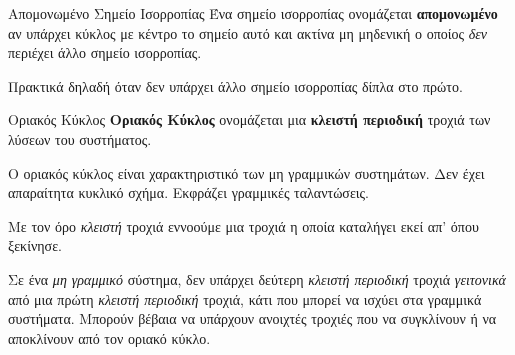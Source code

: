 \documentclass[11pt,a4paper,notitlepage,fleqn]{article}
\begin{document}
\begin{defn}{Απομονωμένο Σημείο Ισορροπίας}{}
	Ένα σημείο ισορροπίας ονομάζεται \textbf{απομονωμένο} αν υπάρχει κύκλος
	με κέντρο το σημείο αυτό και ακτίνα μη μηδενική ο οποίος \textit{δεν} περιέχει άλλο
	σημείο ισορροπίας.
	
	Πρακτικά δηλαδή όταν δεν υπάρχει άλλο σημείο ισορροπίας δίπλα στο πρώτο.
\end{defn}

\begin{defn}{Οριακός Κύκλος}{}
	\textbf{Οριακός Κύκλος} ονομάζεται μια \textbf{κλειστή περιοδική} τροχιά των λύσεων του
	συστήματος.
	
	Ο οριακός κύκλος είναι χαρακτηριστικό των μη γραμμικών συστημάτων. Δεν έχει απαραίτητα
	κυκλικό σχήμα. Εκφράζει γραμμικές ταλαντώσεις.
\end{defn}

Με τον όρο \textit{κλειστή} τροχιά εννοούμε μια τροχιά η οποία καταλήγει
εκεί απ' όπου ξεκίνησε.

Σε ένα \textit{μη γραμμικό} σύστημα, δεν υπάρχει δεύτερη \textit{κλειστή περιοδική} τροχιά
\textit{γειτονικά} από μια πρώτη \textit{κλειστή περιοδική} τροχιά, κάτι που μπορεί να ισχύει
στα γραμμικά συστήματα. Μπορούν βέβαια να υπάρχουν ανοιχτές τροχιές που να συγκλίνουν ή να
αποκλίνουν από τον οριακό κύκλο.

\begin{center}
\end{center}
\end{document}

